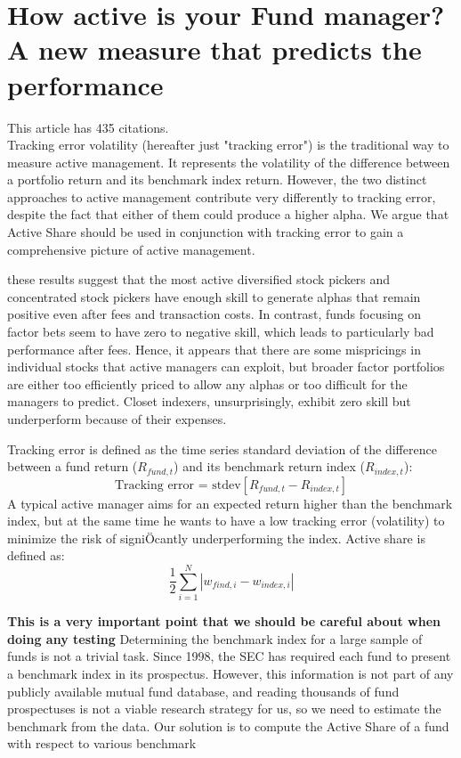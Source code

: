 \documentclass[12 pt]{article}
\begin{document}
\section{How active is your Fund manager? A new measure that predicts the performance}
This article has 435 citations.\\
Tracking error volatility (hereafter just "tracking error") is the traditional way to measure active management. It represents the volatility of the difference between a portfolio return and its benchmark index return. However, the two distinct approaches to active management contribute very differently to tracking error, despite the fact that either of them could produce a higher alpha. We argue that Active Share should be used in conjunction with tracking error to gain a comprehensive picture of active management.
\par these results suggest that the most active diversified stock pickers and
concentrated stock pickers have enough skill to generate alphas that remain positive even after fees and transaction costs. In contrast, funds focusing on factor bets seem to have zero to negative skill, which leads to particularly bad performance after fees. Hence, it appears that there are some mispricings in individual stocks that active managers can exploit, but broader factor portfolios are either too efficiently priced to allow any alphas or too difficult for the managers to predict. Closet indexers, unsurprisingly, exhibit zero skill but underperform because of their expenses.
\par Tracking error is defined as the time series standard deviation of the difference between a fund return ($R_{fund,t}$) and its benchmark return index ($R_{index,t}$): 
\[
\text{Tracking error = stdev}[R_{fund,t}-R_{index,t}]
\]
A typical active manager aims for an expected return higher than the benchmark index, but at the same time he wants to have a low tracking error (volatility) to minimize the risk of signiÖcantly underperforming the index. Active share is defined as:
\[
\frac{1}{2}\sum_{i=1}^N|w_{find,i}-w_{index,i}|
\]
\par \textbf{This is a very important point that we should be careful about when doing any testing} Determining the benchmark index for a large sample of funds is not a trivial task. Since 1998, the SEC has required each fund to present a benchmark index in its prospectus. However, this information is not part of any publicly available mutual fund database, and reading thousands of fund prospectuses is not a viable research strategy for us, so we need to estimate the benchmark from the data. Our solution is to compute the Active Share of a fund with respect to various benchmark
\end{document}
